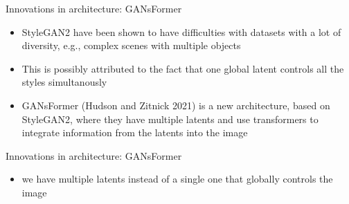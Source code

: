 \begin{frame}{Innovations in architecture: GANsFormer}
\protect\hypertarget{innovations-in-architecture-gansformer}{}

\begin{itemize}
\tightlist
\item
  StyleGAN2 have been shown to have difficulties with datasets with a
  lot of diversity, e.g., complex scenes with multiple objects
\item
  This is possibly attributed to the fact that one global latent
  controls all the styles simultanously
\item
  GANsFormer (Hudson and Zitnick 2021) is a new architecture, based on
  StyleGAN2, where they have multiple latents and use transformers to
  integrate information from the latents into the image
\end{itemize}

\end{frame}

\begin{frame}{Innovations in architecture: GANsFormer}
\protect\hypertarget{innovations-in-architecture-gansformer-1}{}

\begin{itemize}
\tightlist
\item
  we have multiple latents instead of a single one that globally
  controls the image
\end{itemize}


\end{frame}

